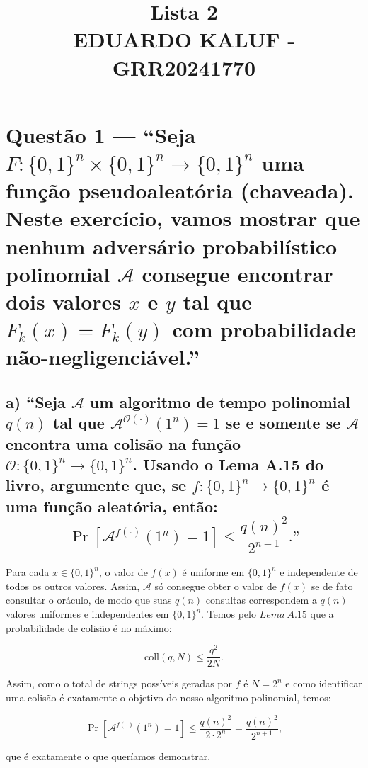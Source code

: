 \documentclass[11pt,a4paper]{article}
\title{Lista 2 \\ EDUARDO KALUF - GRR20241770}
\author{}
\date{}
\begin{document}
    \maketitle

    \section*{Questão 1 --- ``Seja $F\colon \{0,1\}^{n} \times \{0,1\}^{n} \to \{0,1\}^{n}$
        uma função pseudoaleatória (chaveada). Neste exercício, vamos mostrar que nenhum
        adversário probabilístico polinomial $\mathcal{A}$ consegue encontrar dois valores
        $x$ e $y$ tal que $F_k(x) = F_k(y)$ com probabilidade não-negligenciável.''}

    \subsection*{a) ``Seja $\mathcal{A}$ um algoritmo de tempo polinomial $q(n)$ tal que
        $\mathcal{A}^{\mathcal{O}(\cdot)}(1^{n}) = 1$ se e somente se $\mathcal{A}$ encontra
        uma colisão na função $\mathcal{O}\colon \{0,1\}^{n} \to \{0,1\}^{n}$.
        Usando o Lema A.15 do livro, argumente que, se $f\colon \{0,1\}^{n} \to \{0,1\}^{n}$ é uma
        função aleatória, então:
        \[
            \Pr\!\left[\mathcal{A}^{f(\cdot)}(1^{n}) = 1\right] \le \frac{q(n)^{2}}{2^{n+1}}.\text{''}
        \]
    }

    Para cada $x \in \{0,1\}^n$, o valor de $f(x)$ é uniforme em $\{0,1\}^n$ e independente de todos os outros valores.
    Assim, $\mathcal{A}$ só consegue obter o valor de $f(x)$ se de fato consultar o oráculo, de modo que suas $q(n)$
    consultas correspondem a $q(n)$ valores uniformes e independentes em $\{0,1\}^n$.
    Temos pelo $Lema \ A.15$ que a probabilidade de colisão é no máximo:

    \[
        \mathrm{coll}(q, N) \le \frac{q^2}{2N}.
    \]

    Assim, como o total de strings possíveis geradas por $f$ é $N = 2^n$ e como identificar uma colisão é exatamente o objetivo do nosso
    algoritmo polinomial, temos:

    \[
        \Pr\left[\mathcal{A}^{f(\cdot)}(1^n) = 1\right]
        \le \frac{q(n)^2}{2 \cdot 2^n}
        = \frac{q(n)^2}{2^{n+1}},
    \]

    que é exatamente o que queríamos demonstrar.
\end{document}
